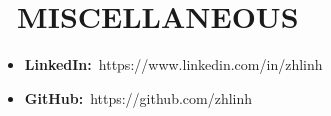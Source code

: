 \documentclass{resume}
\begin{document}
\section{\faInfo\ MISCELLANEOUS}
\begin{itemize}[parsep=0.5ex]
  \item \textbf{LinkedIn:}\ https://www.linkedin.com/in/zhlinh
  \item \textbf{GitHub:}\ https://github.com/zhlinh
\end{itemize}

%
%
\end{document}
